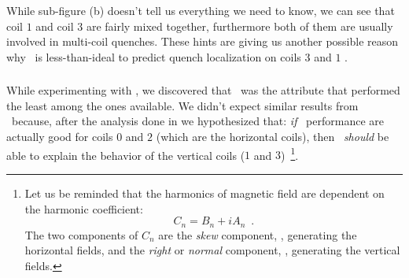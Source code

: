 While sub-figure (b) doesn't tell us everything we need to know, we can see that coil $1$ and coil
$3$ are fairly mixed together, furthermore both of them are usually involved in multi-coil quenches.
These hints are giving us another possible reason why \an\ is less-than-ideal to
predict quench localization on coils $3$ and $1$ .

\subsubsection{\bn}
While experimenting with \qrp, we discovered that \bn\ was the attribute that performed the least
among the ones available. We didn't expect similar results from \qlp\ because, after the analysis
done in  we hypothesized that: \emph{if} \an\ performance are actually good for coils $0$
and $2$ (which are the horizontal coils), then \bn\ \emph{should} be able to explain the behavior of
the vertical coils ($1$ and $3$)~\footnote{
	Let us be reminded that the harmonics of magnetic field are dependent on the harmonic
	coefficient:
	\[C_n = B_n + iA_n \enspace.\]
	The two components of $C_n$ are the \emph{skew} component, \an, generating the horizontal
	fields, and the \emph{right} or \emph{normal} component, \bn, generating the vertical
	fields.
}.


